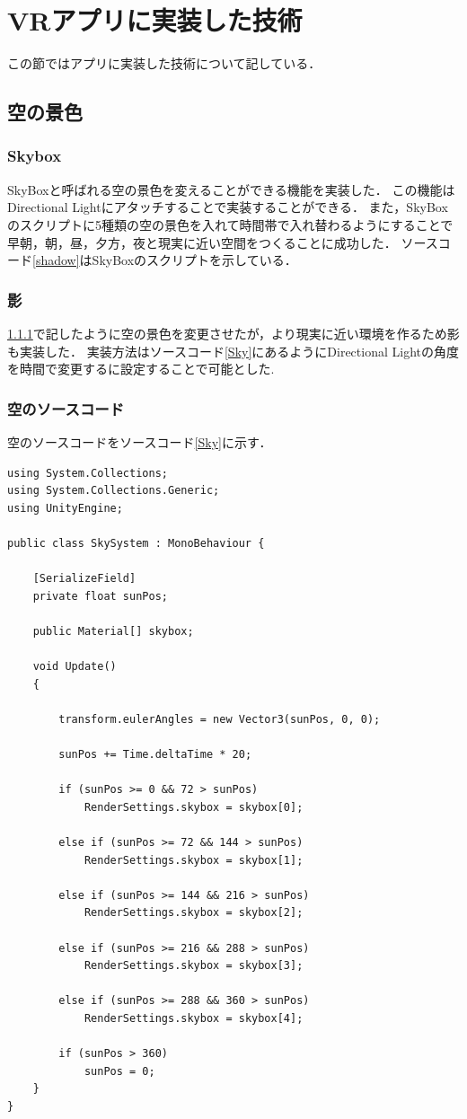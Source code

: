 \documentclass[12pt,a4j,titlepage]{ltjsarticle}
\begin{document}
\section{VRアプリに実装した技術}
この節ではアプリに実装した技術について記している．
\subsection{空の景色}
\subsubsection{Skybox}\label{SkyBox}
SkyBoxと呼ばれる空の景色を変えることができる機能を実装した．
この機能はDirectional Lightにアタッチすることで実装することができる．
また，SkyBoxのスクリプトに5種類の空の景色を入れて時間帯で入れ替わるようにすることで早朝，朝，昼，夕方，夜と現実に近い空間をつくることに成功した．
ソースコード\ref{shadow}はSkyBoxのスクリプトを示している．
\subsubsection{影}
\ref{SkyBox}で記したように空の景色を変更させたが，より現実に近い環境を作るため影も実装した．
実装方法はソースコード\ref{Sky}にあるようにDirectional Lightの角度を時間で変更するに設定することで可能とした.
\subsubsection{空のソースコード}

空のソースコードをソースコード\ref{Sky}に示す．
\begin{lstlisting}[caption=Sky,label=Sky]
using System.Collections;
using System.Collections.Generic;
using UnityEngine;

public class SkySystem : MonoBehaviour {

    [SerializeField]
    private float sunPos;
    
    public Material[] skybox;
    
    void Update()
    {
        
        transform.eulerAngles = new Vector3(sunPos, 0, 0);

        sunPos += Time.deltaTime * 20;
       
        if (sunPos >= 0 && 72 > sunPos)
            RenderSettings.skybox = skybox[0];
      
        else if (sunPos >= 72 && 144 > sunPos)
            RenderSettings.skybox = skybox[1];

        else if (sunPos >= 144 && 216 > sunPos)
            RenderSettings.skybox = skybox[2];

        else if (sunPos >= 216 && 288 > sunPos)
            RenderSettings.skybox = skybox[3];

        else if (sunPos >= 288 && 360 > sunPos)
            RenderSettings.skybox = skybox[4];
      
        if (sunPos > 360)
            sunPos = 0;
    }
}
\end{lstlisting}
\end{document}

